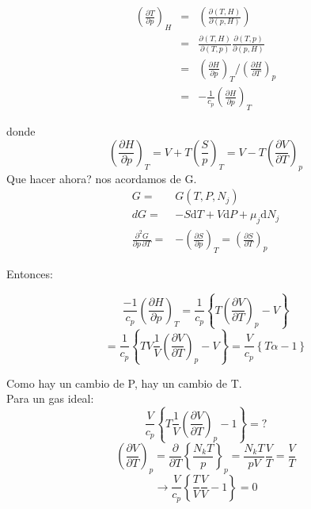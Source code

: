 \documentclass[10pt,twocolumn]{IEEEtran2e}
\newcommand{\ud}{\mathrm{d}}
\begin{document}
\begin{eqnarray}
 \left(\frac{\partial T}{\partial p} \right)_{H} & = & \left(\frac{\partial (T,H)}{\partial (p,H)} \right) \\
  & = & \frac{\partial (T,H)}{\partial (T,p)}\frac{\partial(T,p)}{\partial(p,H)} \\
  & = & \left( \frac{\partial H}{\partial p} \right)_{T} \bigg / \left( \frac{\partial H}{\partial T} \right)_{p} \\
  & = & -\frac{1}{c_{p}}\left(\frac{\partial H}{\partial p} \right)_{T}
\end{eqnarray}

donde
\begin{equation}
\left(\frac{\partial H}{\partial p}\right)_{T} = V + T \left( \frac{S}{p} \right)_{T} = V-T \left(\frac{\partial V}{\partial T} \right)_{p}
\end{equation}
 Que hacer ahora? nos acordamos de G.
\begin{eqnarray}
 G  =& G(T,P,N_{j}) \\
 dG  =& -S \ud T + V\ud P +\mu_{j}\ud N_{j} \\
 \frac{\partial ^{2} G}{\partial p  \, \partial T}  =& -\left(\frac{\partial S}{\partial p} \right)_{T} = \left(\frac{\partial S}{\partial T} \right)_{p}  
\end{eqnarray}

 Entonces:

\begin{equation}
 \frac{-1}{c_{p}}\left(\frac{\partial H}{\partial p} \right)_T = \frac{1}{c_{p}}\left\{T\left(\frac{\partial V}{\partial T}\right)_{p} -V \right\}
\end{equation}
\begin{equation}
 = \frac{1}{c_{p}}\left\{TV \frac{1}{V}\left(\frac{\partial V}{\partial T}\right)_{p} -V \right\}= \frac{V}{c_{p}}\left\{T\alpha - 1\right\}
\end{equation}

Como hay un cambio de P, hay un cambio de T.\\
Para un gas ideal:
\begin{equation}
 \frac{V}{c_{p}}\left\{T\frac{1}{V}\left(\frac{\partial V}{\partial T}\right)_{p} -1 \right\}=?
\end{equation}
\begin{equation}
 \left(\frac{\partial V}{\partial T} \right)_{p} = \frac{\partial}{\partial T}\left\{\frac{N_{k}T}{p}\right\}_{p} = \frac{N_{k}T}{pV} \frac{V}{T} = \frac{V}{T}
\end{equation}
\begin{equation}
 \rightarrow \frac{V}{c_{p}}\left\{\frac{T}{V}\frac{V}{V} - 1\right\} =0
\end{equation}
\end{document}
